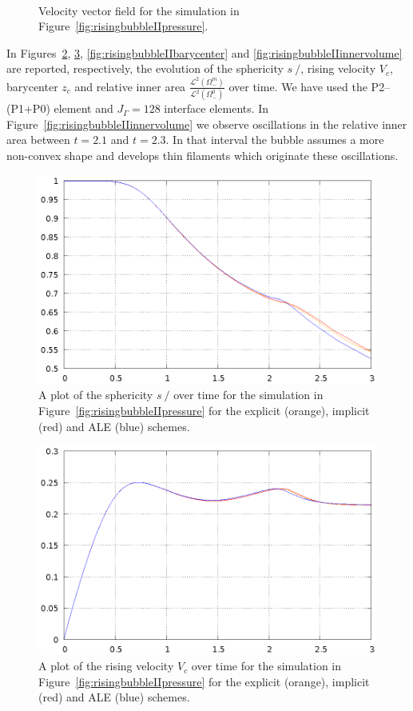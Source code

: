 \documentclass[a4paper,12pt,onecolumn]{article}
\newcommand{\strikes}{\mbox{$s\!\!\!\!\:/$}}
\begin{document}
\begin{figure}[htbp]
\centering
{}
\\
\caption[Navier--Stokes rising bubble II velocity]
{Velocity vector field for the simulation in
Figure~\ref{fig:risingbubbleIIpressure}.}
\label{fig:risingbubbleIIvelocity}
\end{figure}

In Figures~\ref{fig:risingbubbleIIsphericity},
\ref{fig:risingbubbleIIrisingvelocity}, \ref{fig:risingbubbleIIbarycenter} and
\ref{fig:risingbubbleIIinnervolume} are reported, respectively, the evolution of
the sphericity $\strikes$, rising velocity $V_c$, barycenter $z_c$ and relative
inner area $\frac{\mathcal{L}^2(\Omega^m_-)}{\mathcal{L}^2(\Omega^0_-)}$ over
time. We have used the P2--(P1+P0) element and $J_\Gamma=128$ interface
elements. In Figure~\ref{fig:risingbubbleIIinnervolume} we observe oscillations
in the relative inner area between $t=2.1$ and $t=2.3$. In that interval the
bubble assumes a more non-convex shape and develops thin filaments which
originate these oscillations.
\begin{figure}[htbp]
\centering
\includegraphics[width=.45\textwidth]
{figures/rising_bubble_II_sphericity.ps}
\caption[Navier--Stokes rising bubble II sphericity]
{A plot of the sphericity $\strikes$ over time for the simulation in
Figure~\ref{fig:risingbubbleIIpressure} for the explicit (orange), implicit
(red) and ALE (blue) schemes.}
\label{fig:risingbubbleIIsphericity}
\end{figure}

\begin{figure}[htbp]
\centering
\includegraphics[width=.45\textwidth]
{figures/rising_bubble_II_rising_velocity.ps}
\caption[Navier--Stokes rising bubble II rising velocity]
{A plot of the rising velocity $V_c$ over time for the simulation in
Figure~\ref{fig:risingbubbleIIpressure} for the explicit (orange), implicit
(red) and ALE (blue) schemes.}
\label{fig:risingbubbleIIrisingvelocity}
\end{figure}
\end{document}
